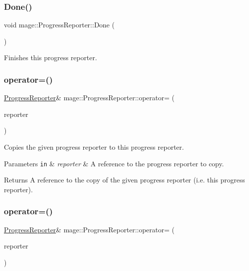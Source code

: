 \subsubsection{\texorpdfstring{Done()}{Done()}}
{\footnotesize\ttfamily void mage\+::\+Progress\+Reporter\+::\+Done (\begin{DoxyParamCaption}{ }\end{DoxyParamCaption})}

Finishes this progress reporter. \hypertarget{classmage_1_1_progress_reporter_aa98411a059ad0e77ca53d064176f3a86}{}\label{classmage_1_1_progress_reporter_aa98411a059ad0e77ca53d064176f3a86} 
\subsubsection{\texorpdfstring{operator=()}{operator=()}\hspace{0.1cm}{\footnotesize\ttfamily [1/2]}}
{\footnotesize\ttfamily \hyperlink{classmage_1_1_progress_reporter}{Progress\+Reporter}\& mage\+::\+Progress\+Reporter\+::operator= (\begin{DoxyParamCaption}\item[{const \hyperlink{classmage_1_1_progress_reporter}{Progress\+Reporter} \&}]{reporter }\end{DoxyParamCaption})\hspace{0.3cm}{\ttfamily [delete]}}

Copies the given progress reporter to this progress reporter.


\begin{DoxyParams}[1]{Parameters}
\mbox{\tt in}  & {\em reporter} & A reference to the progress reporter to copy. \\
\hline
\end{DoxyParams}
\begin{DoxyReturn}{Returns}
A reference to the copy of the given progress reporter (i.\+e. this progress reporter). 
\end{DoxyReturn}
\hypertarget{classmage_1_1_progress_reporter_adfc77427eaff8caf71c1995bf986edc5}{}\label{classmage_1_1_progress_reporter_adfc77427eaff8caf71c1995bf986edc5} 
\subsubsection{\texorpdfstring{operator=()}{operator=()}\hspace{0.1cm}{\footnotesize\ttfamily [2/2]}}
{\footnotesize\ttfamily \hyperlink{classmage_1_1_progress_reporter}{Progress\+Reporter}\& mage\+::\+Progress\+Reporter\+::operator= (\begin{DoxyParamCaption}\item[{\hyperlink{classmage_1_1_progress_reporter}{Progress\+Reporter} \&\&}]{reporter }\end{DoxyParamCaption})\hspace{0.3cm}{\ttfamily [delete]}}

